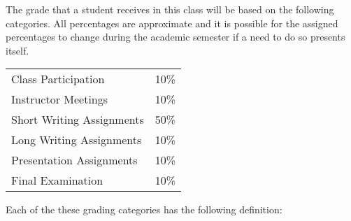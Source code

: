 The grade that a student receives in this class will be based on the
following categories. All percentages are approximate and it is possible
for the assigned percentages to change during the academic semester if a
need to do so presents itself. 

% 
% 
% 
% 
% 
% 

\begin{center}
\begin{tabular}{ll}
Class Participation & 10\% \\
Instructor Meetings & 10\% \\
Short Writing Assignments & 50\% \\
Long Writing Assignments & 10\% \\
Presentation Assignments & 10\% \\
Final Examination & 10\%
\end{tabular}
\end{center}

\noindent
Each of the these grading categories has the following definition:

